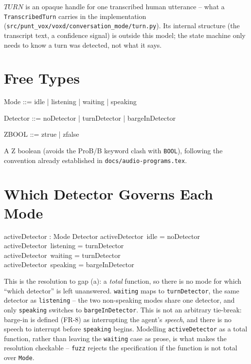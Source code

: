\documentclass[a4paper,10pt,fleqn]{article}
\begin{document}
\begin{zed}
  [TURN]
\end{zed}

$TURN$ is an opaque handle for one transcribed human utterance -- what a
\texttt{TranscribedTurn} carries in the implementation
(\texttt{src/punt\_vox/voxd/conversation\_mode/turn.py}). Its
internal structure (the transcript text, a confidence signal) is outside
this model; the state machine only needs to know a turn was detected, not
what it says.

\section{Free Types}

\begin{zed}
  Mode ::= idle | listening | waiting | speaking
\end{zed}

\begin{zed}
  Detector ::= noDetector | turnDetector | bargeInDetector
\end{zed}

\begin{zed}
  ZBOOL ::= ztrue | zfalse
\end{zed}

A Z boolean (avoids the ProB/B keyword clash with \texttt{BOOL}), following
the convention already established in \texttt{docs/audio-programs.tex}.

\section{Which Detector Governs Each Mode}
\label{sec:detector}

\begin{axdef}
  activeDetector : Mode \fun Detector
  \where
  activeDetector~idle = noDetector \\
  activeDetector~listening = turnDetector \\
  activeDetector~waiting = turnDetector \\
  activeDetector~speaking = bargeInDetector
\end{axdef}

This is the resolution to gap (a): a \emph{total} function, so there is no
mode for which ``which detector'' is left unanswered. \texttt{waiting} maps
to \texttt{turnDetector}, the same detector as \texttt{listening} -- the two
non-speaking modes share one detector, and only \texttt{speaking} switches to
\texttt{bargeInDetector}. This is not an arbitrary tie-break: barge-in is
defined (FR-8) as interrupting the agent's \emph{speech}, and there is no
speech to interrupt before \texttt{speaking} begins. Modelling
\texttt{activeDetector} as a total function, rather than leaving the
\texttt{waiting} case as prose, is what makes the resolution checkable --
\texttt{fuzz} rejects the specification if the function is not total over
\texttt{Mode}.
\end{document}
